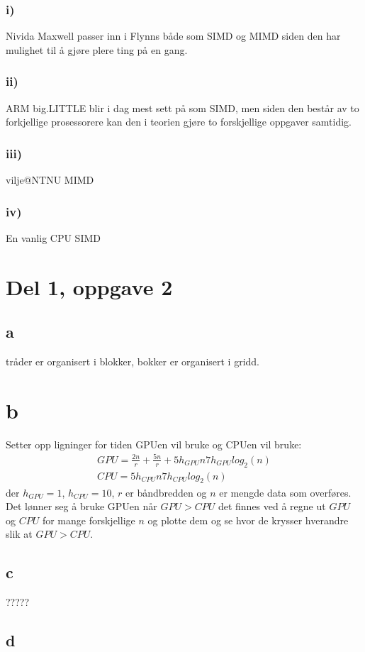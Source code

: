 \documentclass[12pt, a4paper]{article} %
\begin{document}
\subsubsection*{i)}
Nivida Maxwell passer inn i Flynns både som SIMD og MIMD siden den har mulighet til å gjøre plere ting på en gang.
\subsubsection*{ii)}
ARM big.LITTLE blir i dag mest sett på som SIMD, men siden den består av to forkjellige prosessorere kan den i teorien gjøre to forskjellige oppgaver samtidig.
\subsubsection*{iii)}
vilje@NTNU MIMD
\subsubsection*{iv)}
En vanlig CPU SIMD


\section*{Del 1, oppgave 2}
\subsection*{a}
tråder er organisert i blokker, bokker er organisert i gridd.

\section*{b}
Setter opp ligninger for tiden GPUen vil bruke og CPUen vil bruke:
\begin{align*}
GPU=\frac{2n}{r}+\frac{5n}{r}+5h_{GPU}n7h_{GPU}log_2(n)\\
CPU=5h_{CPU}n7h_{CPU}log_2(n)
\end{align*}
der $h_{GPU}=1$, $h_{CPU}=10$, $r$ er båndbredden og $n$ er mengde data som overføres. Det lønner seg å bruke GPUen når $GPU>CPU$ det finnes ved å regne ut $GPU$ og $CPU$ for mange forskjellige $n$ og plotte dem og se hvor de krysser hverandre slik at $GPU>CPU$.  


\subsection*{c}
?????

\subsection*{d}
\end{document}
